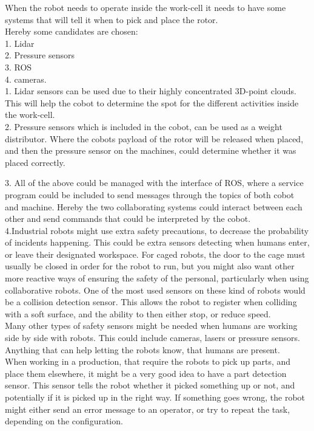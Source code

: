  When the robot needs to operate inside the work-cell it needs to have some systems that will tell it when to pick and place the rotor.\\
 Hereby some candidates are chosen:\\
 1. Lidar\\
 2. Pressure sensors\\
 3. ROS\\
 4. cameras.\\
 
 1. Lidar sensors can be used due to their highly concentrated 3D-point clouds. This will help the cobot to determine the spot for the different activities inside the work-cell.\\
 
 2. Pressure sensors which is included in the cobot, can be used as a weight distributor. Where the cobots payload of the rotor will be released when placed, and then the pressure sensor on the machines, could determine whether it was placed correctly.\\
 
 3. All of the above could be managed with the interface of ROS, where a service program could be included to send messages through the topics of both cobot and machine. Hereby the two collaborating systems could interact between each other and send commands that could be interpreted by the cobot.\\
 
 4.Industrial robots might use extra safety precautions, to decrease the probability of incidents happening. This could be extra sensors detecting when humans enter, or leave their designated workspace. For caged robots, the door to the cage must usually be closed in order for the robot to run, but you might also want other more reactive ways of ensuring the safety of the personal, particularly when using collaborative robots. One of the most used sensors on these kind of robots would be a collision detection sensor. This allows the robot to register when colliding with a soft surface, and the ability to then either stop, or reduce speed.\\

Many other types of safety sensors might be needed when humans are working side by side with robots. This could include cameras, lasers or pressure sensors. Anything that can help letting the robots know, that humans are present.\\

When working in a production, that require the robots to pick up parts, and place them elsewhere, it might be a very good idea to have a part detection sensor. This sensor tells the robot whether it picked something up or not, and potentially if it is picked up in the right way. If something goes wrong, the robot might either send an error message to an operator, or try to repeat the task, depending on the configuration.\\